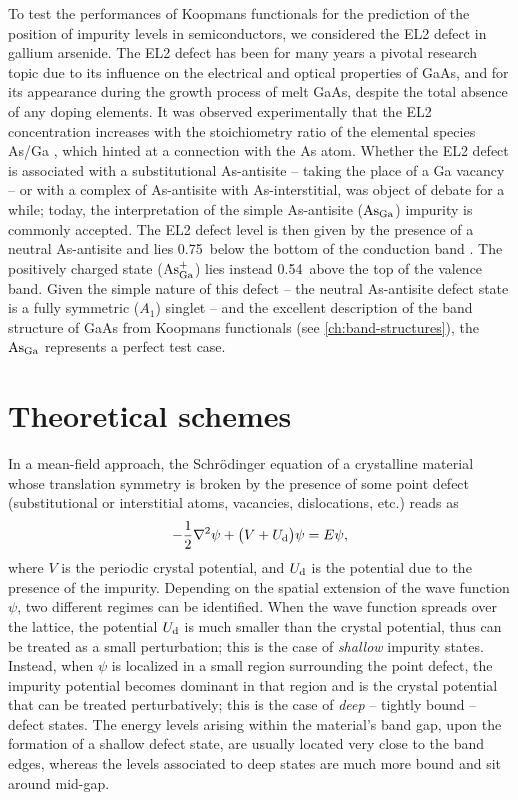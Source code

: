 To test the performances of Koopmans functionals for the prediction of the position of impurity levels in semiconductors, we considered the EL2 defect in gallium arsenide. The EL2 defect has been for many years a pivotal research topic due to its influence on the electrical and optical properties of GaAs, and for its appearance during the growth process of melt GaAs, despite the total absence of any doping elements. It was observed experimentally that the EL2 concentration increases with the stoichiometry ratio of the elemental species As/Ga \cite{kaminska_el2_1987}, which hinted at a connection with the As atom. Whether the EL2 defect is associated with a substitutional As-antisite -- taking the place of a Ga vacancy -- or with a complex of As-antisite with As-interstitial, was object of debate for a while; today, the interpretation of the simple As-antisite ($\rm As_{Ga}$) impurity is commonly accepted. The EL2 defect level is then given by the presence of a neutral As-antisite and lies 0.75~\mev below the bottom of the conduction band \cite{kaminska_el2_1987,dabrowski_isolated_1989,komsa_assessing_2011}. The positively charged state ($\rm As_{Ga}^+$) lies instead 0.54~\mev above the top of the valence band. Given the simple nature of this defect -- the neutral As-antisite defect state is a fully symmetric ($A_1$) singlet -- and the excellent description of the band structure of GaAs from Koopmans functionals (see \cref{ch:band-structures}), the $\rm As_{Ga}$ represents a perfect test case.

\section{Theoretical schemes\label{sec:theory-defects}}
In a mean-field approach, the Schr\"{o}dinger equation of a crystalline material whose translation symmetry is broken by the presence of some point defect (substitutional or interstitial atoms, vacancies, dislocations, etc.) reads as
%
\begin{equation}
    -\frac{1}{2} \nabla^2 \psi + \big( V + U_{\rm d } \big) \psi = E \psi ,
    \label{eq:schrodinger-eq-defects}
\end{equation}
%
where $V$ is the periodic crystal potential, and $U_{\rm d}$ is the potential due to the presence of the impurity. Depending on the spatial extension of the wave function $\psi$, two different regimes can be identified. When the wave function spreads over the lattice, the potential $U_{\rm d}$ is much smaller than the crystal potential, thus can be treated as a small perturbation; this is the case of \emph{shallow} impurity states. Instead, when $\psi$ is localized in a small region surrounding the point defect, the impurity potential becomes dominant in that region and is the crystal potential that can be treated perturbatively; this is the case of \emph{deep} -- tightly bound -- defect states. The energy levels arising within the material's band gap, upon the formation of a shallow defect state, are usually located very close to the band edges, whereas the levels associated to deep states are much more bound and sit around mid-gap.

